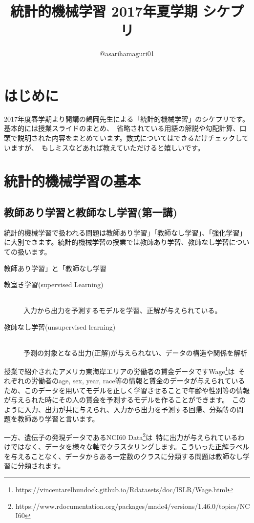 \documentclass[uplatex]{jsarticle}
\title{統計的機械学習 2017年夏学期 シケプリ}
\author{@asarihamaguri01}
\begin{document}
\maketitle

\section{はじめに}
2017年度春学期より開講の鶴岡先生による「統計的機械学習」のシケプリです。基本的には授業スライドのまとめ、\
省略されている用語の解説や勾配計算、口頭で説明された内容をまとめています。数式についてはできるだけチェックしていますが、\
もしミスなどあれば教えていただけると嬉しいです。


\section{統計的機械学習の基本}
\subsection{教師あり学習と教師なし学習(第一講)}
統計的機械学習で扱われる問題は教師あり学習」「教師なし学習」、「強化学習」に大別できます。統計的機械学習の授業では教師あり学習、教師なし学習についての扱います。

\begin{itembox}[l]{教師あり学習」と「教師なし学習}
  \begin{description}
    \item [教室き学習(supervised Learning)]\mbox{}\\
    入力から出力を予測するモデルを学習、正解が与えられている。
    \item [教師なし学習(unsupervised learning)]\mbox{}\\
    予測の対象となる出力(正解)が与えられない、データの構造や関係を解析
  \end{description}
\end{itembox}

授業で紹介されたアメリカ東海岸エリアの労働者の賃金データですWage\footnote{https://vincentarelbundock.github.io/Rdatasets/doc/ISLR/Wage.html}は\
それぞれの労働者のage, sex, year, race等の情報と賃金のデータが与えられているため、このデータを用いてモデルを正しく学習させることで年齢や性別等の情報が与えられた時にその人の賃金を予測するモデルを作ることができます。\
このように入力、出力が共に与えられ、入力から出力を予測する回帰、分類等の問題を教師あり学習と言います。

一方、遺伝子の発現データであるNCI60 Data\footnote{https://www.rdocumentation.org/packages/made4/versions/1.46.0/topics/NCI60}は\
特に出力が与えられているわけではなく、データを様々な軸でクラスタリングします。こういった正解ラベルを与えることなく、データからある一定数のクラスに分類する問題は教師なし学習に分類されます。
\end{document}
